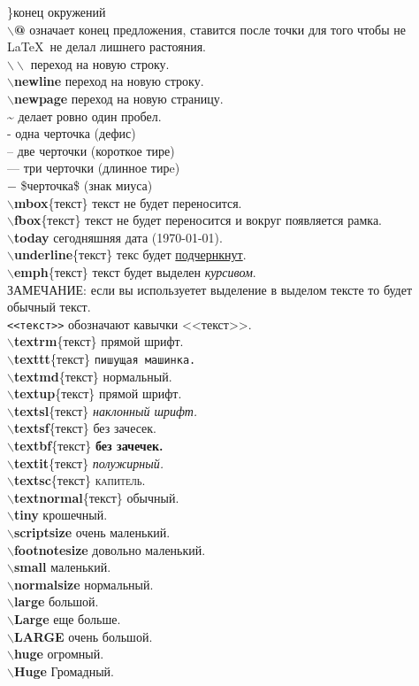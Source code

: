 \documentclass{article}
\newcommand{\bb}[1]{{\bfseries $\backslash$#1}} %
\begin{document}
\}конец окружений\\

\bb{@} означает конец предложения, ставится после точки для того чтобы не \LaTeX~не делал лишнего растояния.\\
$\backslash \backslash$ переход на новую строку.\\
\bb{newline} переход на новую строку.\\
\bb{newpage} переход на новую страницу.\\
\~{} делает ровно один пробел.\\
- одна черточка (дефис)\\
-- две черточки (короткое тире)\\
--- три черточки (длинное тирe)\\
$-$ \$черточка\$ (знак миуса)\\	
\bb{mbox}\{текст\} текст не будет переносится.\\
\bb{fbox}\{текст\} текст не будет переносится и вокруг появляется рамка.\\
\bb{today} сегодняшняя дата (\today).\\
\bb{underline}\{текст\} текс будет \underline{подчернкнут}.\\
\bb{emph}\{текст\} текст будет выделен \emph{курсивом}.\\
ЗАМЕЧАНИЕ: если вы используетет выделение в выделом тексте то будет обычный текст.\\
\verb|<<текст>>| обозначают кавычки <<текст>>.\\

\bb{textrm}\{текст\} \textrm{прямой шрифт}.\\
\bb{texttt}\{текст\} \texttt{пишущая машинка.}\\
\bb{textmd}\{текст\} \textmd{нормальный.}\\
\bb{textup}\{текст\} \textup{прямой шрифт.}\\
\bb{textsl}\{текст\} \textsl{наклонный шрифт.}\\
\bb{textsf}\{текст\} \textsf{без зачесек.}\\
\bb{textbf}\{текст\} \textbf{без зачечек.}\\
\bb{textit}\{текст\} \textit{полужирный.}\\
\bb{textsc}\{текст\} \textsc{капитель.}\\
\bb{textnormal}\{текст\} \textnormal{обычный.}\\

\bb{tiny} {\tiny крошечный}.\\
\bb{scriptsize} {\scriptsize очень маленький}.\\
\bb{footnotesize} {\footnotesize довольно маленький}.\\
\bb{small} {\small маленький}.\\
\bb{normalsize} {\normalsize нормальный}.\\
\bb{large} {\large большой}.\\
\bb{Large} {\Large еще больше}.\\
\bb{LARGE} {\LARGE очень большой}.\\
\bb{huge} {\huge огромный}.\\
\bb{Huge} {\Huge Громадный}.\\
\end{document}
